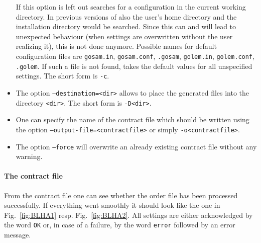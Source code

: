 \begin{itemize}
   If  this option is left out \gosam{} searches for a configuration in the current working directory. In previous versions of \gosam also the user's home directory and the \gosam installation directory would be searched. Since this can and will lead to unexpected behaviour (when settings are overwritten without the user realizing it), this is not done anymore.
   Possible names for default configuration files are \texttt{gosam.in},
   \texttt{gosam.conf}, \texttt{.gosam}, \texttt{golem.in},
   \texttt{golem.conf}, \texttt{.golem}.
   If such a file is not found, \gosam{} takes the default values for 
   all unspecified settings.
   The short form is \texttt{-c}.
\item  The option \texttt{--destination=<dir>} allows 
   to place the generated files into the directory \texttt{<dir>}.
   The short form is \texttt{-D<dir>}.
\item One can specify the name of the contract file which should be written
   using the option \texttt{--output-file=<contractfile>} or simply
   \texttt{-o<contractfile>}.
\item The option \texttt{--force} will overwrite an already existing
   contract file without any warning. 
\end{itemize}

\paragraph{The contract file}
From the contract file one can see whether the order file has been processed successfully.
If everything went smoothly it should look like the one in Fig.~\ref{fig:BLHA1}
resp. Fig.~\ref{fig:BLHA2}.
All settings are either acknowledged by the word \texttt{OK} or, in case
of a failure, by the word \texttt{error} followed by an error message.


